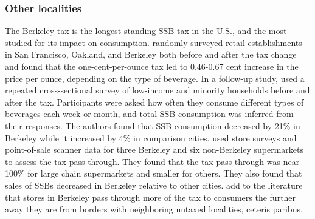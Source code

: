 \documentclass[12pt]{article}
\begin{document}
\subsubsection{Other localities} \label{otherlocalities}

The Berkeley tax is the longest standing SSB tax in the U.S., and the most studied for its impact on consumption. \textcite{falbe2015higher} randomly surveyed retail establishments in San Francisco, Oakland, and Berkeley both before and after the tax change and found that the one-cent-per-ounce tax led to 0.46-0.67 cent increase in the price per ounce, depending on the type of beverage. In a follow-up study, \textcite{falbe2016impact} used a repeated cross-sectional survey of low-income and minority households before and after the tax. Participants were asked how often they consume different types of beverages each week or month, and total SSB consumption was inferred from their responses. The authors found that SSB consumption decreased by 21\% in Berkeley while it increased by 4\% in comparison cities. \textcite{silver2017changes} used store surveys and point-of-sale scanner data for three Berkeley and six non-Berkeley supermarkets to assess the tax pass through. They found that the tax pass-through was near 100\% for large chain supermarkets and smaller for others. They also found that sales of SSBs decreased in Berkeley relative to other cities. \textcite{cawley2017berkeley} add to the literature that stores in Berkeley pass through more of the tax to consumers the further away they are from borders with neighboring untaxed localities, ceteris paribus.
\end{document}
